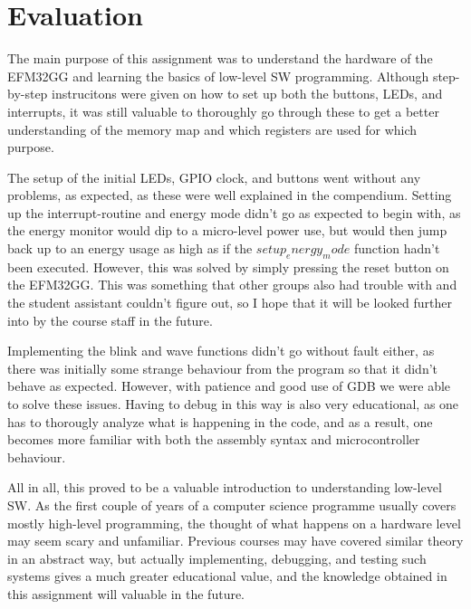 \section{Evaluation}

The main purpose of this assignment was to understand the hardware of the EFM32GG and learning the basics of low-level SW programming. Although step-by-step instrucitons were given on how to set up both the buttons, LEDs, and interrupts, it was still valuable to thoroughly go through these to get a better understanding of the memory map and which registers are used for which purpose.

The setup of the initial LEDs, GPIO clock, and buttons went without any problems, as expected, as these were well explained in the compendium\cite{compendium}. Setting up the interrupt-routine and energy mode didn't go as expected to begin with, as the energy monitor would dip to a micro-level power use, but would then jump back up to an energy usage as high as if the $setup_energy_mode$ function hadn't been executed. However, this was solved by simply pressing the reset button on the EFM32GG. This was something that other groups also had trouble with and the student assistant couldn't figure out, so I hope that it will be looked further into by the course staff in the future.

Implementing the blink and wave functions didn't go without fault either, as there was initially some strange behaviour from the program so that it didn't behave as expected. However, with patience and good use of GDB we were able to solve these issues. Having to debug in this way is also very educational, as one has to thorougly analyze what is happening in the code, and as a result, one becomes more familiar with both the assembly syntax and microcontroller behaviour.

All in all, this proved to be a valuable introduction to understanding low-level SW. As the first couple of years of a computer science programme usually covers mostly high-level programming, the thought of what happens on a hardware level may seem scary and unfamiliar. Previous courses may have covered similar theory in an abstract way, but actually implementing, debugging, and testing such systems gives a much greater educational value, and the knowledge obtained in this assignment will valuable in the future.